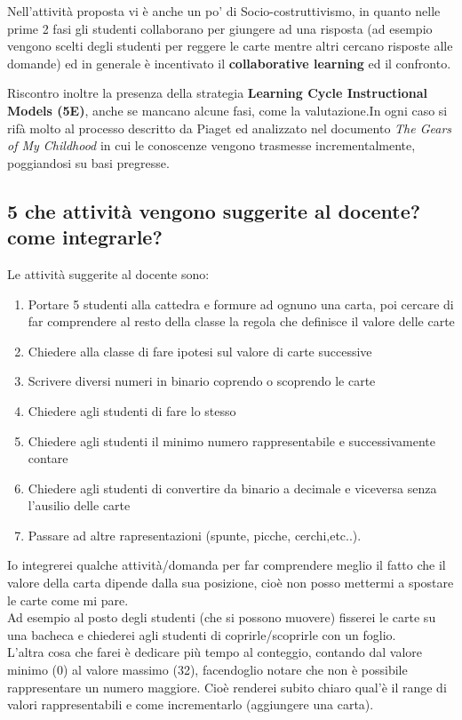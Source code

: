 \documentclass[a4paper]{article}
\begin{document}
Nell'attività proposta vi è anche un po' di Socio-costruttivismo, in quanto nelle prime 2 fasi gli studenti collaborano per giungere ad una risposta (ad esempio vengono scelti degli studenti per reggere le carte mentre altri cercano risposte alle domande) ed in generale è incentivato il \textbf{collaborative learning} ed il confronto.

Riscontro inoltre la presenza della strategia \textbf{Learning Cycle Instructional Models (5E)}, anche se mancano alcune fasi, come la valutazione.In ogni caso si rifà molto al processo descritto da Piaget ed analizzato nel documento \emph{The Gears of My Childhood} \cite{gears} in cui le conoscenze vengono trasmesse incrementalmente, poggiandosi su basi pregresse.

\subsection{5 che attività vengono suggerite al docente? come integrarle?}
Le attività suggerite al docente sono:
\begin{enumerate}
	\item Portare 5 studenti alla cattedra e formure ad ognuno una carta, poi cercare di far comprendere al resto della classe la regola che definisce il valore delle carte
	\item Chiedere alla classe di fare ipotesi sul valore di carte successive
	\item Scrivere diversi numeri in binario coprendo o scoprendo le carte
	\item Chiedere agli studenti di fare lo stesso
	\item Chiedere agli studenti il minimo numero rappresentabile e successivamente contare
	\item Chiedere agli studenti di convertire da binario a decimale e viceversa senza l'ausilio delle carte
	\item Passare ad altre rapresentazioni (spunte, picche, cerchi,etc..).
\end{enumerate}
Io integrerei qualche attività/domanda per far comprendere meglio il fatto che il valore della carta dipende dalla sua posizione, cioè non posso mettermi a spostare le carte come mi pare.\\
Ad esempio al posto degli studenti (che si possono muovere) fisserei le carte su una bacheca e chiederei agli studenti di coprirle/scoprirle con un foglio.\\

L'altra cosa che farei è dedicare più tempo al conteggio, contando dal valore minimo (0) al valore massimo (32), facendoglio notare che non è possibile rappresentare un numero maggiore. Cioè renderei subito chiaro qual'è il range di valori rappresentabili e come incrementarlo (aggiungere una carta).
\printbibliography
\end{document}
